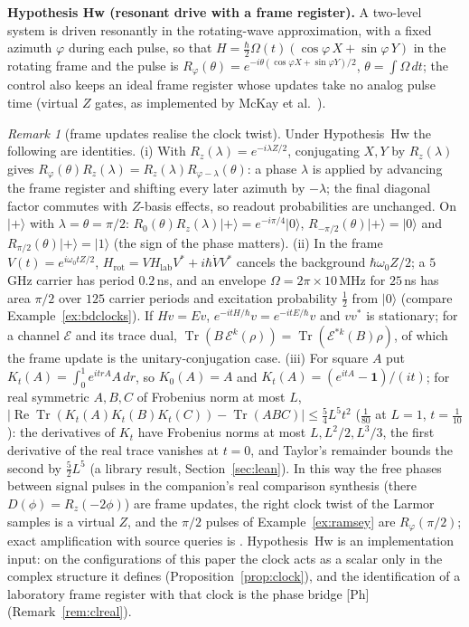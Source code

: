 \documentclass[aps,pra,onecolumn,superscriptaddress,nofootinbib,10pt]{revtex4-2}
\theoremstyle{definition}
\theoremstyle{remark}
\newtheorem{remark}[theorem]{Remark}
\newcommand{\re}{\operatorname{Re}}
\newcommand{\tr}{\operatorname{Tr}}
\begin{document}
\smallskip\noindent\textbf{Hypothesis Hw (resonant drive with a frame register).}  A two-level system is driven
resonantly in the rotating-wave approximation, with a fixed azimuth $\varphi$ during each pulse, so that
$H=\tfrac\hbar2\Omega(t)(\cos\varphi\,X+\sin\varphi\,Y)$ in the rotating frame and the pulse is $R_\varphi(\theta)=e^{-i\theta(\cos\varphi X+\sin\varphi Y)/2}$, $\theta=\int\Omega\,dt$; the
control also keeps an ideal frame register whose updates take no analog pulse time (virtual $Z$ gates,
as implemented by McKay et al.\ \cite{m4:McKay}).

\begin{remark}[frame updates realise the clock twist]\label{rem:exframe}
Under Hypothesis~Hw the following are identities.  (i) With $R_z(\lambda)=e^{-i\lambda Z/2}$, conjugating $X,Y$ by $R_z(\lambda)$ gives
$R_\varphi(\theta)R_z(\lambda)=R_z(\lambda)R_{\varphi-\lambda}(\theta)$: a phase $\lambda$ is applied by advancing the frame register and shifting every later azimuth
by $-\lambda$; the final diagonal factor commutes with $Z$-basis effects, so readout probabilities are unchanged.  On $\lvert+\rangle$ with
$\lambda=\theta=\pi/2$: $R_0(\theta)R_z(\lambda)\lvert+\rangle=e^{-i\pi/4}\lvert0\rangle$, $R_{-\pi/2}(\theta)\lvert+\rangle=\lvert0\rangle$ and $R_{\pi/2}(\theta)\lvert+\rangle=\lvert1\rangle$ (the sign of the phase matters).
(ii) In the frame $V(t)=e^{i\omega_0tZ/2}$, $H_{\mathrm{rot}}=VH_{\mathrm{lab}}V^*+i\hbar\dot VV^*$ cancels the background $\hbar\omega_0Z/2$; a $5$\,GHz carrier has period $0.2$\,ns,
and an envelope $\Omega=2\pi\times10$\,MHz for $25$\,ns has area $\pi/2$ over $125$ carrier periods and excitation probability $\tfrac12$ from $\lvert0\rangle$
(compare Example~\ref{ex:bdclocks}).  If $Hv=Ev$, $e^{-itH/\hbar}v=e^{-itE/\hbar}v$ and $vv^*$ is stationary; for a channel $\mathcal E$ and its trace dual,
$\tr(B\,\mathcal E^k(\rho))=\tr(\mathcal E^{*k}(B)\rho)$, of which the frame update is the unitary-conjugation case.  (iii) For square $A$ put
$K_t(A)=\int_0^1e^{itrA}A\,dr$, so $K_0(A)=A$ and $K_t(A)=(e^{itA}-\mathbf1)/(it)$; for real symmetric $A,B,C$ of Frobenius norm at most $L$,
$\lvert\re\tr(K_t(A)K_t(B)K_t(C))-\tr(ABC)\rvert\le\tfrac54L^5t^2$ ($\tfrac1{80}$ at $L=1$, $t=\tfrac1{10}$): the derivatives of $K_t$ have Frobenius norms at most $L,L^2/2,L^3/3$,
the first derivative of the real trace vanishes at $t=0$, and Taylor's remainder bounds the second by $\tfrac52L^5$ (a library result,
Section~\ref{sec:lean}).  In this way the free phases between signal pulses in the companion's real comparison synthesis
\cite[Thm.~6A.1]{PaperI} (there $D(\phi)=R_z(-2\phi)$) are frame updates, the right clock twist of the Larmor samples is a
virtual $Z$, and the $\pi/2$ pulses of Example~\ref{ex:ramsey} are $R_\varphi(\pi/2)$; exact amplification with source queries is
\cite[Prop.~6A.8]{PaperI}.  Hypothesis~Hw is an implementation input: on the configurations of this paper the clock
acts as a scalar only in the complex structure it defines (Proposition~\ref{prop:clock}), and the identification of
a laboratory frame register with that clock is the phase bridge [Ph] (Remark~\ref{rem:clreal}).
\end{remark}
\end{document}
